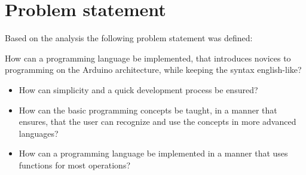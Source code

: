 \section{Problem statement}
Based on the analysis the following problem statement was defined:
\begin{center}
	How can a programming language be implemented, that introduces novices to programming on the Arduino architecture, while keeping the syntax english-like?

\begin{itemize}
	\item How can simplicity and a quick development process be ensured?
	\item How can the basic programming concepts be taught, in a manner that ensures, that the user can recognize and use the concepts in more advanced languages?
	\item How can a programming language be implemented in a manner that uses functions for most operations? 
\end{itemize}
\end{center}
